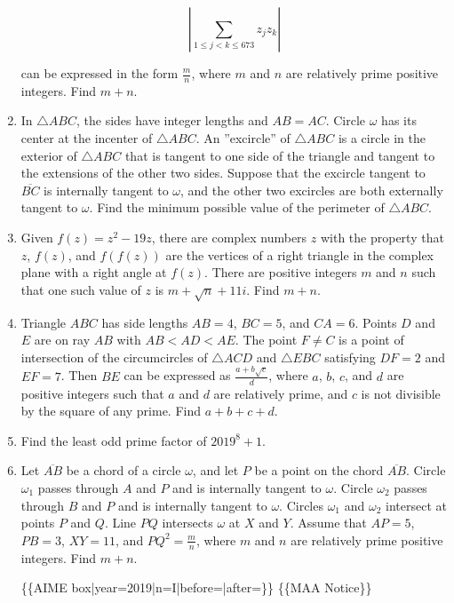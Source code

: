 \documentclass{article}
\begin{document}
\begin{enumerate}[label=\arabic*., itemsep=0.5em]
\begin{equation*}
\left| \sum_{1 \le j <k \le 673} z_jz_k \right|
\end{equation*}

can be expressed in the form \(\tfrac{m}{n}\), where \(m\) and \(n\) are relatively prime positive integers. Find \(m+n\).\par \vspace{0.5em}\item In \(\triangle ABC\), the sides have integer lengths and \(AB=AC\). Circle \(\omega\) has its center at the incenter of \(\triangle ABC\). An ''excircle'' of \(\triangle ABC\) is a circle in the exterior of \(\triangle ABC\) that is tangent to one side of the triangle and tangent to the extensions of the other two sides. Suppose that the excircle tangent to \(\overline{BC}\) is internally tangent to \(\omega\), and the other two excircles are both externally tangent to \(\omega\). Find the minimum possible value of the perimeter of \(\triangle ABC\).\par \vspace{0.5em}\item Given \(f(z) = z^2-19z\), there are complex numbers \(z\) with the property that \(z\), \(f(z)\), and \(f(f(z))\) are the vertices of a right triangle in the complex plane with a right angle at \(f(z)\). There are positive integers \(m\) and \(n\) such that one such value of \(z\) is \(m+\sqrt{n}+11i\). Find \(m+n\).\par \vspace{0.5em}\item Triangle \(ABC\) has side lengths \(AB=4\), \(BC=5\), and \(CA=6\). Points \(D\) and \(E\) are on ray \(AB\) with \(AB<AD<AE\). The point \(F \neq C\) is a point of intersection of the circumcircles of \(\triangle ACD\) and \(\triangle EBC\) satisfying \(DF=2\) and \(EF=7\). Then \(BE\) can be expressed as \(\tfrac{a+b\sqrt{c}}{d}\), where \(a\), \(b\), \(c\), and \(d\) are positive integers such that \(a\) and \(d\) are relatively prime, and \(c\) is not divisible by the square of any prime. Find \(a+b+c+d\).\par \vspace{0.5em}\item Find the least odd prime factor of \(2019^8 + 1\).\par \vspace{0.5em}\item Let \(\overline{AB}\) be a chord of a circle \(\omega\), and let \(P\) be a point on the chord \(\overline{AB}\). Circle \(\omega_1\) passes through \(A\) and \(P\) and is internally tangent to \(\omega\). Circle \(\omega_2\) passes through \(B\) and \(P\) and is internally tangent to \(\omega\). Circles \(\omega_1\) and \(\omega_2\) intersect at points \(P\) and \(Q\). Line \(PQ\) intersects \(\omega\) at \(X\) and \(Y\). Assume that \(AP=5\), \(PB=3\), \(XY=11\), and \(PQ^2 = \tfrac{m}{n}\), where \(m\) and \(n\) are relatively prime positive integers. Find \(m+n\).



\{\{AIME box|year=2019|n=I|before=|after=\}\}
\{\{MAA Notice\}\}\par \vspace{0.5em}
\end{enumerate}
\end{document}
